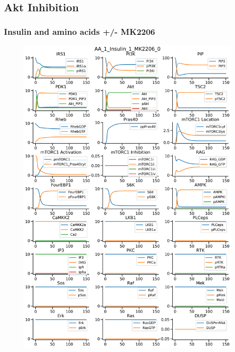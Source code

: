 \documentclass{beamer}
\begin{document}
\subsection{Akt Inhibition} %
\begin{frame}
\frametitle{Insulin and amino acids +/- MK2206}
\begin{figure}
    \begin{minipage}{0.45\textwidth}
        \centering
        \includegraphics[width=\textwidth]{../simulations/ExtendedPI3KModel/validations/AAWithInsulinWithMK2206/AA_1_Insulin_1_MK2206_0-6.png}
    \end{minipage}
    \begin{minipage}{0.45\textwidth}
        \centering

\end{minipage}
\end{figure}
\end{frame}
\end{document}
